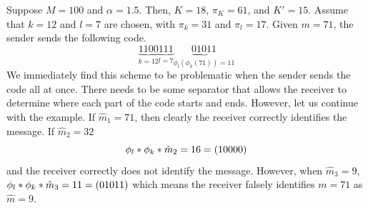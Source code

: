\begin{example}
	Suppose \(M = 100\) and \(\alpha = 1.5\). Then, \(K = 18\), \(\pi_K = 61\), and \(K' = 15\). Assume that \(k = 12\) and \(l = 7\) are chosen, with \(\pi_k = 31\) and \(\pi_l = 17\). Given \(m = 71\), the sender sends the following code. 
	\begin{equation*}
		\underbrace{1100}_{k = 12} \underbrace{111}_{l = 7} \underbrace{01011}_{\phi_l(\phi_k(71)) = 11}
	\end{equation*}
	We immediately find this scheme to be problematic when the sender sends the code all at once. There needs to be some separator that allows the receiver to determine where each part of the code starts and ends. However, let us continue with the example. If \(\hat{m}_1 = 71\), then clearly the receiver correctly identifies the message. If \(\hat{m}_2 = 32\) 
	\begin{equation*}
		\func{\phi_l}{\func{\phi_k}{\hat{m}_2}} = 16 = (10000)
	\end{equation*}
	and the receiver correctly does not identify the message. However, when \(\hat{m}_3 = 9\), \(\func{\phi_l}{\func{\phi_k}{\hat{m}_3}}= 11 = (01011)\) which means the receiver falsely identifies \(m = 71\) as \(\hat{m} = 9\).
\end{example}

